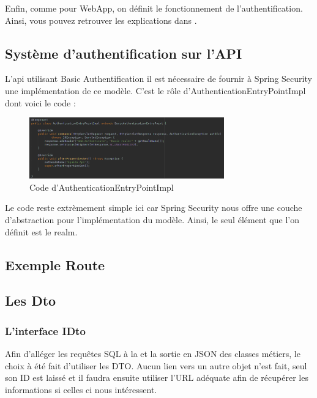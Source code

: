 			Enfin, comme pour WebApp, on définit le fonctionnement de l'authentification. Ainsi, vous pouvez retrouver les explications dans .

		\subsection{Système d'authentification sur l'API}
			\label{subsec:basic_auth}

			L'api utilisant Basic Authentification il est nécessaire de fournir à Spring Security une implémentation de ce modèle. C'est le rôle d'AuthenticationEntryPointImpl dont voici le code :

			\begin{figure}[H]
				\centering\includegraphics[width=0.75\textwidth, keepaspectratio]{res/AuthenticationEntryPointImpl.png}
				\caption{Code d'AuthenticationEntryPointImpl}
			\end{figure}

			Le code reste extrèmement simple ici car Spring Security nous offre une couche d'abstraction pour l'implémentation du modèle. Ainsi, le seul élément que l'on définit est le realm.

		\subsection{Exemple Route}


		\subsection{Les Dto}

			\subsubsection{L'interface IDto}

				Afin d'alléger les requêtes SQL à la \bdd{} et la sortie en JSON des classes métiers, le choix à été fait d'utiliser les DTO. Aucun lien vers un autre objet n'est fait, seul son ID est laissé et il faudra ensuite utiliser l'URL adéquate afin de récupérer les informations si celles ci nous intéressent.

